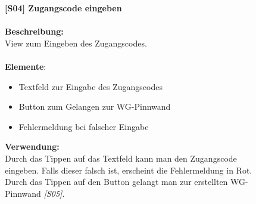 \documentclass[a4paper]{scrreprt}
\begin{document}
\begin{figure}[h!]
    		\begin{minipage}[t]{0.55\linewidth}
    			\flushleft
    			\vspace{9mm}
    			\textbf{{[}S04{]} Zugangscode eingeben} \\
    			\hfill
    			\\\textbf{Beschreibung:} \\
    			View zum Eingeben des Zugangscodes.\\
    			\hfill
    			\\\textbf{Elemente}:
    			\begin{itemize}
    				\renewcommand\labelitemi{--}
    				\item Textfeld zur Eingabe des Zugangscodes
    				\item Button zum Gelangen zur WG-Pinnwand
    				\item Fehlermeldung bei falscher Eingabe
    			\end{itemize}
    		
    			\hfill
    			
    			\textbf{Verwendung:}\\
    			Durch das Tippen auf das Textfeld kann man
    			den Zugangscode eingeben. Falls dieser falsch 
    			ist, erscheint die Fehlermeldung in Rot.
    			\\
    			Durch das Tippen auf den Button gelangt man
    			zur erstellten WG-Pinnwand \textit{{[}S05{]}}. 
    			
    			
    			
    		\end{minipage}
    	\end{figure}
    
    	\clearpage
    	
\end{document}
